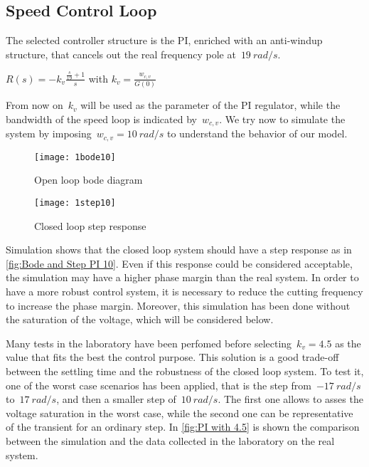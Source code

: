 \newpage
\subsection{Speed Control Loop}
The selected controller structure is the PI, enriched with an anti-windup structure, that cancels out the real frequency pole at~$19\ rad/s$.
\begin{center}
$ R(s) = -k_v \frac{\frac{s}{19}+1}{s} $
with
$ k_{v} = \frac{w_{c,v}}{G(0)} $
\end{center}
From now on~$k_v$ will be used as the parameter of the PI regulator, while the bandwidth of the speed loop is indicated by~$w_{c,v}$. We try now to simulate the system by imposing~$w_{c,v} = 10\ rad/s$ to understand the behavior of our model.
\\
\begin{figure*}[h]
	\centering
	\begin{subfigure}{0.47\columnwidth}
		\texttt{[image: 1bode10]}
		\caption{Open loop bode diagram}
	\end{subfigure}
	\begin{subfigure}{0.47\columnwidth}
		\texttt{[image: 1step10]}
		\caption{Closed loop step response}
	\end{subfigure}
	\caption{Speed control loop with $w_{c,v} = 10\ rad/s$}
	\label{fig:Bode and Step PI 10}
\end{figure*}

Simulation shows that the closed loop system should have a step response as in \cref{fig:Bode and Step PI 10}. 
Even if this response could be considered acceptable, the simulation may have a higher phase margin than the real system. In order to have a more robust control system, it is necessary to reduce the cutting frequency to increase the phase margin. Moreover, this simulation has been done without the saturation of the voltage, which will be considered below.

Many tests in the laboratory have been perfomed before selecting~$k_v=4.5$ as the value that fits the best the control purpose. This solution is a good trade-off between the settling time and the robustness of the closed loop system.
To test it, one of the worst case scenarios has been applied, that is the step from~$-17\ rad/s$ to~$17\ rad/s$, and then a smaller step of~$10\ rad/s$. The first one allows to asses the voltage saturation in the worst case, while the second one can be representative of the transient for an ordinary step.
In \cref{fig:PI with 4.5} is shown the comparison between the simulation and the data collected in the laboratory on the real system.

